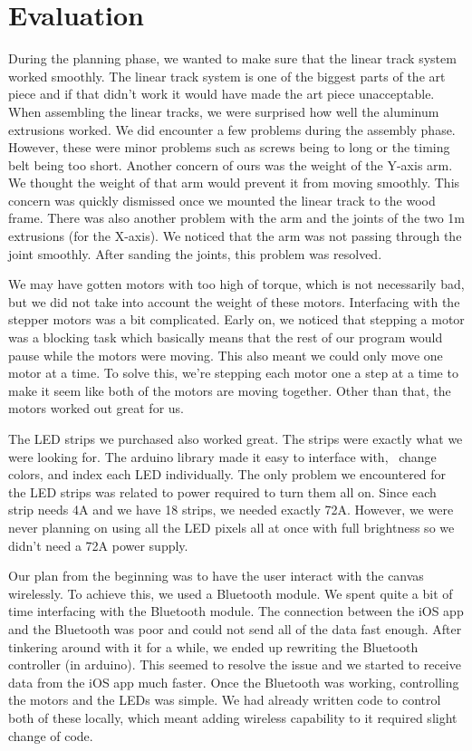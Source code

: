 \documentclass[12pt]{article}
\begin{document}
\section{Evaluation}
During the planning phase, we wanted to make sure that the linear track system worked smoothly. The linear track system is one of the biggest parts of the art piece and if that didn’t work it would have made the art piece unacceptable. When assembling the linear tracks, we were surprised how well the aluminum extrusions worked. We did encounter a few problems during the assembly phase. However, these were minor problems such as screws being to long or the timing belt being too short. Another concern of ours was the weight of the Y-axis arm. We thought the weight of that arm would prevent it from moving smoothly. This concern was quickly dismissed once we mounted the linear track to the wood frame. There was also another problem with the arm and the joints of the two 1m extrusions (for the X-axis). We noticed that the arm was not passing through the joint smoothly. After sanding the joints, this problem was resolved. 

We may have gotten motors with too high of torque, which is not necessarily bad, but we did not take into account the weight of these motors. Interfacing with the stepper motors was a bit complicated. Early on, we noticed that stepping a motor was a blocking task which basically means that the rest of our program would pause while the motors were moving. This also meant we could only move one motor at a time. To solve this, we’re stepping each motor one a step at a time to make it seem like both of the motors are moving together. Other than that, the motors worked out great for us.

The LED strips we purchased also worked great. The strips were exactly what we were looking for. The arduino library made it easy to interface with,  change colors, and index each LED individually. The only problem we encountered for the LED strips was related to power required to turn them all on. Since each strip needs 4A and we have 18 strips, we needed exactly 72A. However, we were never planning on using all the LED pixels all at once with full brightness so we didn’t need a 72A power supply.

Our plan from the beginning was to have the user interact with the canvas wirelessly. To achieve this, we used a Bluetooth module. We spent quite a bit of time interfacing with the Bluetooth module. The connection between the iOS app and the Bluetooth was poor and could not send all of the data fast enough. After tinkering around with it for a while, we ended up rewriting the Bluetooth controller (in arduino). This seemed to resolve the issue and we started to receive data from the iOS app much faster. Once the Bluetooth was working, controlling the motors and the LEDs was simple. We had already written code to control both of these locally, which meant adding wireless capability to it required slight change of code.
\end{document}
